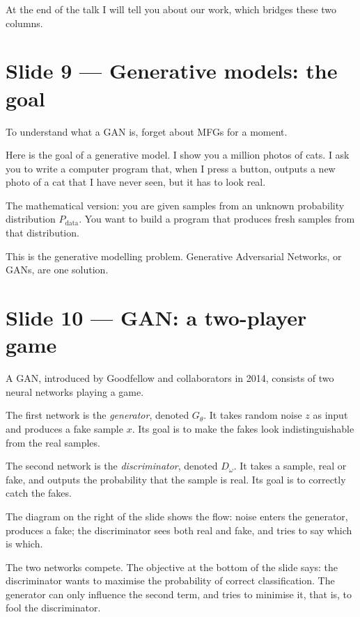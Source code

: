 \documentclass[11pt]{article}
\begin{document}
At the end of the talk I will tell you about our work, which bridges
these two columns.

\section*{Slide 9 --- Generative models: the goal}

To understand what a GAN is, forget about MFGs for a moment.

Here is the goal of a generative model.  I show you a million photos of
cats.  I ask you to write a computer program that, when I press a button,
outputs a new photo of a cat that I have never seen, but it has to look
real.

The mathematical version: you are given samples from an unknown
probability distribution $P_{\text{data}}$.  You want to build a program
that produces fresh samples from that distribution.

This is the generative modelling problem.  Generative Adversarial
Networks, or GANs, are one solution.

\section*{Slide 10 --- GAN: a two-player game}

A GAN, introduced by Goodfellow and collaborators in 2014, consists of
two neural networks playing a game.

The first network is the \emph{generator}, denoted $G_\theta$.  It takes
random noise $z$ as input and produces a fake sample $x$.  Its goal is
to make the fakes look indistinguishable from the real samples.

The second network is the \emph{discriminator}, denoted $D_\omega$.  It
takes a sample, real or fake, and outputs the probability that the
sample is real.  Its goal is to correctly catch the fakes.

The diagram on the right of the slide shows the flow: noise enters the
generator, produces a fake; the discriminator sees both real and fake,
and tries to say which is which.

The two networks compete.  The objective at the bottom of the slide says:
the discriminator wants to maximise the probability of correct
classification.  The generator can only influence the second term, and
tries to minimise it, that is, to fool the discriminator.
\end{document}
